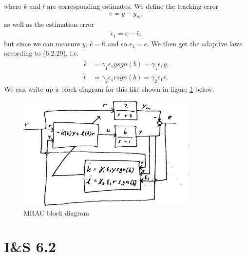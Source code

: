 \documentclass[]{article}
\begin{document}
where $k$ and $l$ are corresponding estimates. We define the tracking error
\begin{equation}\begin{aligned}
e = y - y_m,
\end{aligned}\end{equation}
as well as the estimation error
\begin{equation}\begin{aligned}
\epsilon_1 = e - \hat e,
\end{aligned}\end{equation}
but since we can measure $y$, $\hat e = 0$ and so $\epsilon_1 = e$. We then get the adaptive laws according to (6.2.29), i.e.
\begin{equation}\begin{aligned}
\dot k &= \gamma_1 \epsilon_1 y sgn(b) = \gamma_1 \epsilon_1 y,\\
\dot l &= \gamma_2 \epsilon_1 r sgn(b) = \gamma_2 \epsilon_1 r.
\end{aligned}\end{equation}
We can write up a block diagram for this like shown in figure \ref{fig:mrac1} below.
\begin{figure}[H]
\centering
\includegraphics[width=0.8\textwidth]{mrac1}
\caption{MRAC block diagram}
\label{fig:mrac1}
\end{figure}

\section{I\&S 6.2}
\end{document}
